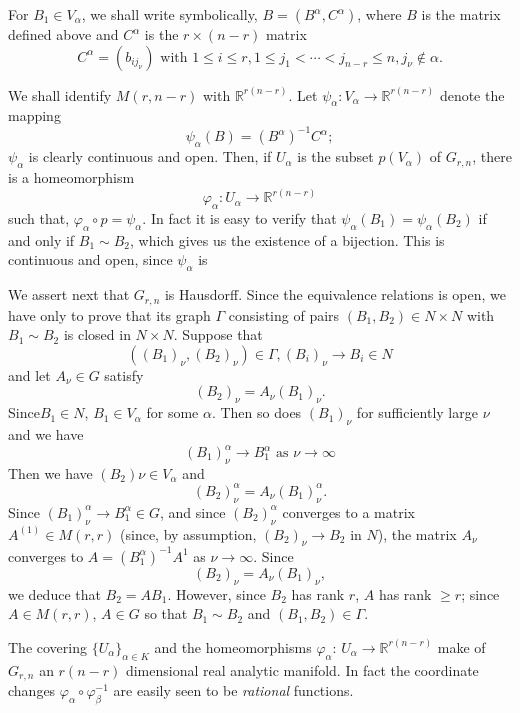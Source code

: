  For $B_1 \in V_\alpha$, we shall write symbolically, $B= (B^\alpha,
  C^\alpha)$, where $B$ is the matrix defined above and $C^\alpha$ is
  the $r \times (n-r)$ matrix  
  $$
  C^\alpha = (b_{ij_\nu}) \text{ with } 1 \le i \le r, 1 \le j_1
  <\cdots <  j_{n-r} \le n, j_\nu \notin \alpha. 
  $$  
  
  We shall identify $M(r, n-r)$ with $\mathbb{R}^{r(n-r)}$. Let
  $\psi_\alpha: V_\alpha \to \mathbb{R}^{r(n-r)}$ denote the mapping 
  $$
  \psi_\alpha (B) = (B^\alpha)^{-1} C^\alpha;
  $$
  $\psi_\alpha$ is clearly continuous and open. Then, if $U_\alpha$ is
  the subset $p(V_\alpha)$ of $G_{r,n}$, there is a homeomorphism 
  $$
  \varphi_\alpha:U_\alpha \to \mathbb{R}^{r(n-r)}
  $$ 
  such that, $\varphi_\alpha \circ p = \psi_\alpha$. In fact it is easy to
  verify that $\psi_\alpha(B_1)= \psi_\alpha(B_2)$ if and only  if
  $B_1 \sim B_2$, which gives us the existence of a bijection. This is
  continuous and open, since $\psi_\alpha$ is  
  
  We assert next that $G_{r,n}$ is Hausdorff. Since the equivalence
  relations is open, we have only  to prove that its graph $\Gamma$
  consisting of pairs $(B_1, B_2) \in N \times N$ with $B_1 \sim B_2$
  is closed in $N \times N$. Suppose that  
  $$
 ((B_1)_\nu , (B_2)_\nu) \in \Gamma, (B_i)_\nu \to B_i \in N
 $$
 and let $A_\nu \in G$ satisfy
 $$
 (B_2)_\nu= A_\nu (B_1)_\nu.
 $$
 Since\pageoriginale $B_1 \in N$, $B_1 \in V_\alpha$ for some $\alpha$. Then so does
 $(B_1)_\nu$ for sufficiently large $\nu$ and we have 
$$
(B_1)^\alpha_\nu \to  B^{\alpha}_1 \text{ as } \nu \to \infty
$$ 
Then we have $(B_2) \nu \in V_\alpha$ and 
$$
(B_2)^\alpha_\nu = A_\nu  (B_1)^\alpha_\nu.
$$
Since  $ (B_1)^\alpha_\nu \to  B_1^\alpha  \in G$, and since $
(B_2)^\alpha_\nu$ converges to a matrix $A^{(1)} \in M(r,r)$ (since,
by assumption, $(B_2)_\nu \to B_2$ in $N$), the matrix $A_\nu$
converges to $A= (B^\alpha_1)^{-1} A^{1}$ as $\nu \to \infty$. Since  
$$
(B_2)_\nu = A_\nu (B_1)_\nu,
$$
we deduce that $B_2= A B_1$. However, since $B_2$ has rank $r$, $A$
has rank $\ge r$; since $A\in  M(r,r)$, $A \in G$ so that $B_1 \sim
B_2$ and $(B_1, B_2) \in \Gamma$. 
  
  The covering $\{ U_\alpha\}_{\alpha \in K}$ and the homeomorphisms
  $\varphi_\alpha$: $U_\alpha \to \mathbb{R}^{r(n-r)}$ make of
  $G_{r,n}$ an $r(n-r)$ dimensional real analytic manifold. In fact
  the coordinate changes $\varphi_\alpha \circ \varphi^{-1}_\beta$ are
  easily seen to be  \textit{rational} functions. 
  
